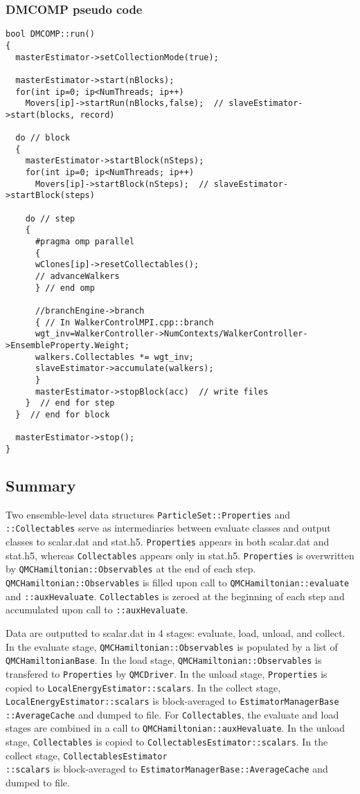 \subsubsection{DMCOMP  pseudo code}
\begin{lstlisting}
bool DMCOMP::run()
{
  masterEstimator->setCollectionMode(true);
  
  masterEstimator->start(nBlocks);
  for(int ip=0; ip<NumThreads; ip++)
    Movers[ip]->startRun(nBlocks,false);  // slaveEstimator->start(blocks, record)
  
  do // block
  {
    masterEstimator->startBlock(nSteps);
    for(int ip=0; ip<NumThreads; ip++)
      Movers[ip]->startBlock(nSteps);  // slaveEstimator->startBlock(steps)
    
    do // step
    {
      #pragma omp parallel
      {
      wClones[ip]->resetCollectables();
      // advanceWalkers
      } // end omp
      
      //branchEngine->branch
      { // In WalkerControlMPI.cpp::branch
      wgt_inv=WalkerController->NumContexts/WalkerController->EnsembleProperty.Weight;
      walkers.Collectables *= wgt_inv;
      slaveEstimator->accumulate(walkers);
      }
      masterEstimator->stopBlock(acc)  // write files
    }  // end for step
  }  // end for block
  
  masterEstimator->stop();
}
\end{lstlisting}

\subsection{Summary}

Two ensemble-level data structures \verb|ParticleSet::Properties| and \verb|::Collectables| serve as intermediaries between evaluate classes and output classes to scalar.dat and stat.h5. \verb|Properties| appears in both scalar.dat and stat.h5, whereas \verb|Collectables| appears only in stat.h5. \verb|Properties| is overwritten by \verb|QMCHamiltonian::Observables| at the end of each step. \verb|QMCHamiltonian::Observables| is filled upon call to \verb|QMCHamiltonian::evaluate| and \verb|::auxHevaluate|. \verb|Collectables| is zeroed at the beginning of each step and accumulated upon call to \verb|::auxHevaluate|.

Data are outputted to scalar.dat in 4 stages: evaluate, load, unload, and collect. In the evaluate stage, \verb|QMCHamiltonian::Observables| is populated by a list of \verb|QMCHamiltonianBase|. In the load stage, \verb|QMCHamiltonian::Observables| is transfered to \verb|Properties| by \verb|QMCDriver|. In the unload stage, \verb|Properties| is copied to \verb|LocalEnergyEstimator::scalars|. In the collect stage, \verb|LocalEnergyEstimator::scalars| is block-averaged to \verb|EstimatorManagerBase|\\ \verb|::AverageCache| and dumped to file. For \verb|Collectables|, the evaluate and load stages are combined in a call to \verb|QMCHamiltonian::auxHevaluate|. In the unload stage, \verb|Collectables| is copied to \verb|CollectablesEstimator::scalars|. In the collect stage, \verb|CollectablesEstimator|\\ \verb|::scalars| is block-averaged to \verb|EstimatorManagerBase::AverageCache| and dumped to file.


